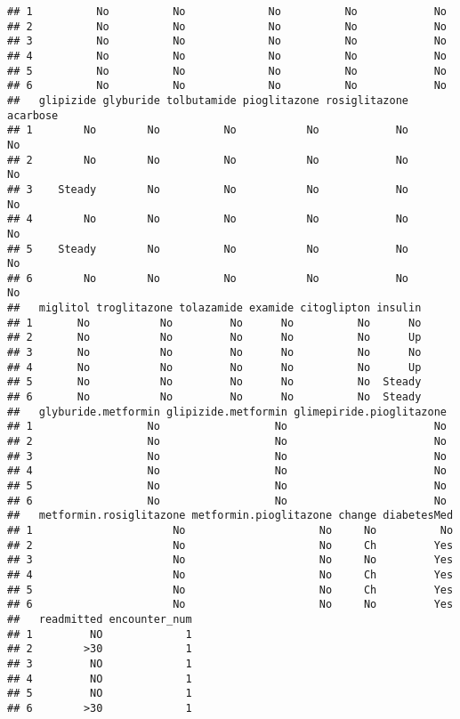 \documentclass[
]{article}
\begin{document}
\begin{verbatim}
## 1          No          No             No          No            No
## 2          No          No             No          No            No
## 3          No          No             No          No            No
## 4          No          No             No          No            No
## 5          No          No             No          No            No
## 6          No          No             No          No            No
##   glipizide glyburide tolbutamide pioglitazone rosiglitazone acarbose
## 1        No        No          No           No            No       No
## 2        No        No          No           No            No       No
## 3    Steady        No          No           No            No       No
## 4        No        No          No           No            No       No
## 5    Steady        No          No           No            No       No
## 6        No        No          No           No            No       No
##   miglitol troglitazone tolazamide examide citoglipton insulin
## 1       No           No         No      No          No      No
## 2       No           No         No      No          No      Up
## 3       No           No         No      No          No      No
## 4       No           No         No      No          No      Up
## 5       No           No         No      No          No  Steady
## 6       No           No         No      No          No  Steady
##   glyburide.metformin glipizide.metformin glimepiride.pioglitazone
## 1                  No                  No                       No
## 2                  No                  No                       No
## 3                  No                  No                       No
## 4                  No                  No                       No
## 5                  No                  No                       No
## 6                  No                  No                       No
##   metformin.rosiglitazone metformin.pioglitazone change diabetesMed
## 1                      No                     No     No          No
## 2                      No                     No     Ch         Yes
## 3                      No                     No     No         Yes
## 4                      No                     No     Ch         Yes
## 5                      No                     No     Ch         Yes
## 6                      No                     No     No         Yes
##   readmitted encounter_num
## 1         NO             1
## 2        >30             1
## 3         NO             1
## 4         NO             1
## 5         NO             1
## 6        >30             1
\end{verbatim}
\end{document}
